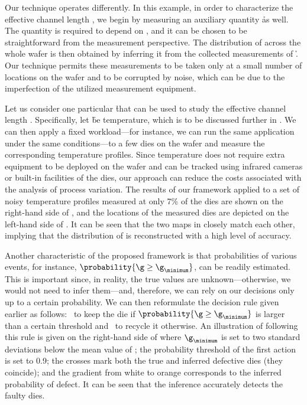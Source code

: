 Our technique operates differently. In this example, in order to characterize
the effective channel length \g, we begin by measuring an auxiliary quantity \h
as well. The quantity is required to depend on \g, and it can be chosen to be
straightforward from the measurement perspective. The distribution of \g across
the whole wafer is then obtained by inferring it from the collected measurements
of \h. Our technique permits these measurements to be taken only at a small
number of locations on the wafer and to be corrupted by noise, which can be due
to the imperfection of the utilized measurement equipment.

Let us consider one particular \h that can be used to study the effective
channel length \g. Specifically, let \h be temperature, which is to be discussed
further in . We can then apply a fixed workload---for
instance, we can run the same application under the same conditions---to a few
dies on the wafer and measure the corresponding temperature profiles. Since
temperature does not require extra equipment to be deployed on the wafer and can
be tracked using infrared cameras \cite{mesa-martinez2007} or built-in
facilities of the dies, our approach can reduce the costs associated with the
analysis of process variation. The results of our framework applied to a set of
noisy temperature profiles measured at only 7\% of the dies are shown on the
right-hand side of , and the locations of
the measured dies are depicted on the left-hand side of
. It can be seen that the two maps in
 closely match each other, implying that the
distribution of \g is reconstructed with a high level of accuracy.

Another characteristic of the proposed framework is that probabilities of
various events, for instance, $\probability{\g \geq \g_\minimum}$, can be
readily estimated. This is important since, in reality, the true values are
unknown---otherwise, we would not need to infer them---and, therefore, we can
rely on our decisions only up to a certain probability. We can then reformulate
the decision rule given earlier as follows: \one~to keep the die if
$\probability{\g \geq \g_\minimum}$ is larger than a certain threshold and
\two~to recycle it otherwise. An illustration of following this rule is given on
the right-hand side of  where $\g_\minimum$ is
set to two standard deviations below the mean value of \g; the probability
threshold of the first action is set to 0.9; the crosses mark both the true and
inferred defective dies (they coincide); and the gradient from white to orange
corresponds to the inferred probability of defect. It can be seen that the
inference accurately detects the faulty dies.

